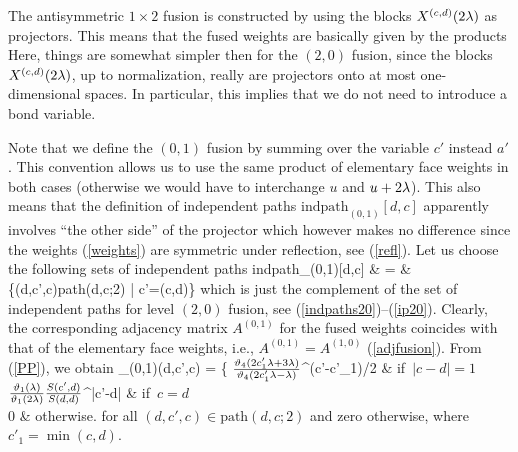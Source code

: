 The antisymmetric $1\times 2$ fusion is constructed by using
the blocks $X^{(c,d)}(2\lambda)$ as projectors.
This means that the fused weights are basically given by the products
\be
\zeroonefu
\ee
Here, things are somewhat simpler then for the $(2,0)$ fusion, since the
blocks $X^{(c,d)}(2\lambda)$, up to normalization, really are projectors onto
at most one-dimensional spaces. In particular, this implies that we do not
need to introduce a bond variable.

Note that we define the $(0,1)$ fusion by summing over the variable $c'$
instead $a'$. This convention allows us to use the same product of
elementary face weights in both cases (otherwise we would have to
interchange $u$ and $u+2\lambda$). This also means that the definition
of independent paths $\mbox{indpath}_{(0,1)}[d,c]$ apparently involves
``the other side'' of the projector which however makes no difference
since the weights (\ref{weights}) are symmetric under reflection,
see (\ref{refl}). Let us choose the following sets of independent paths
\be
\mbox{indpath}_{(0,1)}[d,c] & = &
\left\{(d,c',c)\in\mbox{path}(d,c;2) | c'=\min(c,d)\right\}
\label{indpaths01}
\ee
which is just the complement of the set of independent paths for level
$(2,0)$ fusion, see (\ref{indpaths20})--(\ref{ip20}). Clearly,
the corresponding adjacency matrix $A^{(0,1)}$ for the fused weights
coincides with that of the elementary face weights, i.e.,
$A^{(0,1)}=A^{(1,0)}$ (\ref{adjfusion}).
{}From (\ref{PP}), we obtain\renewcommand{\arraystretch}{2}
\be
\phi_{(0,1)}(d,c',c) = \left\{
  \disp \(\frac{\thd{2c'_1\la+3\la}}{\thd{2c'_1\la-\la}}\)^{(c'-c'_1)/2}
   & \mbox{if $|c-d|=1$} \\
  \disp \(\frac{\tha{\la}}{\tha{2\la}}\frac{S(c',d)}{S(d,d)}\)^{|c'-d|}
   & \mbox{if $c=d$} \\
  0 & \mbox{otherwise}\ea \right.
\label{phi01}
\ee
\renewcommand{\arraystretch}{1}
for all $(d,c',c)\in\mbox{path}(d,c;2)$ and zero otherwise,
where $c'_1=\min(c,d)$.


